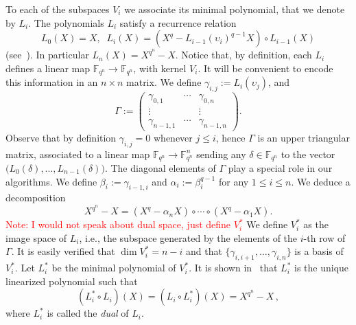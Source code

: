 \documentclass{article}
\newcommand{\ff}[1]{\mathbb{F}_{#1}}
\newcommand{\qq}{q}
\newcommand{\nn}{n}
\newcommand{\qn}{{\qq^\nn}}
\newcommand{\extf}{\ff{\qn}}
\newcounter{algo}
\newcommand{\Notes}[1]{\textcolor{red}{Note: #1}}
\begin{document}
To each of the subspaces $V_i$ we associate its minimal polynomial, that we denote by
$L_i$. The polynomials $L_i$ satisfy a recurrence relation 
\begin{equation}
\label{Li_generation}
  L_0(X) = X, \; \;  L_i(X) = (X^\qq - L_{i-1}(\upsilon_i)^{\qq-1}X)\circ L_{i-1}(X)
\end{equation}
(see~\cite[Ch. 11]{mBER84a}). In particular $L_\nn(X)=X^\qn-X$. Notice that, by definition, each $L_i$ defines a linear map
$\extf\to\extf$, with kernel $V_i$. It will be convenient to encode
this information in an $\nn\times\nn$ matrix. We define
$\gamma_{i,j}:=L_i(\upsilon_j)$, and
\begin{equation}
  \label{eq:Gamma}
  \Gamma :=
  \begin{pmatrix}
    \gamma_{0,1} & \cdots & \gamma_{0,\nn}\\
    \vdots & & \vdots\\
    \gamma_{\nn-1,1} & \cdots & \gamma_{\nn-1,\nn}
  \end{pmatrix}.
\end{equation}
Observe that by definition $\gamma_{i,j}=0$ whenever $j\le i$, hence
$\Gamma$ is an upper triangular matrix, associated to a linear map
$\extf\to\extf^\nn$ sending any $\delta\in\extf$ to the vector
$\bigl(L_0(\delta),\dots,\allowbreak L_{n-1}(\delta)\bigr)$.  The diagonal elements of $\Gamma$ play a special role in our algorithms.
We define $\beta_i:=\gamma_{i-1,i}$ and $\alpha_i:=\beta_i^{\qq-1}$
for any $1\le i \le \nn$. We deduce a decomposition
\begin{equation}
\label{decomposition_field_eq_gen}
  X^\qn - X = (X^\qq - \alpha_\nn X) \circ \cdots \circ (X^\qq - \alpha_1 X).
\end{equation}
\Notes{I would not speak about dual space, just define $V_i^\ast$}
We define $V_i^\ast$ as the image space of $L_i$, i.e., the subspace
generated by the elements of the $i$-th row of $\Gamma$.  It is easily verified that
$\dim V_i^\ast=n-i$ and that $\{\gamma_{i,i+1},\dots,\gamma_{i,\nn}\}$
is a basis of $V_i^\ast$. Let $L_i^\ast$ be the minimal polynomial of
$V_i^\ast$. It is shown in~\cite[Ch. 11]{mBER84a} that
$L_i^\ast$ is the unique linearized polynomial such that
\begin{equation}
\label{dual_polynomial}
(L_i^\ast \circ L_i)(X)=(L_i \circ L_i^\ast)(X)=X^\qn-X\,,
\end{equation}
where $L_i^\ast$ is called the \emph{dual} of $L_i$.

\medskip
\end{document}
